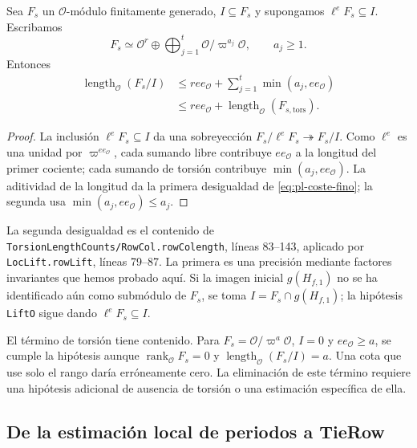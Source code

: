 \begin{proposicion}
\label{prop:pl-coste}
Sea $F_s$ un $\mathcal O$-módulo finitamente generado, $I\subseteq
F_s$ y supongamos $\ell^e F_s\subseteq I$. Escribamos
\[
 F_s\simeq\mathcal O^r\oplus
           \bigoplus_{j=1}^t\mathcal O/\varpi^{a_j}\mathcal O,
 \qquad a_j\geq1.
\]
Entonces
\begin{equation}
\begin{aligned}
 \operatorname{length}_{\mathcal O}(F_s/I)
 &\leq r e e_{\mathcal O}+\sum_{j=1}^t\min(a_j,e e_{\mathcal O})
 \\
 &\leq r e e_{\mathcal O}
      +\operatorname{length}_{\mathcal O}(F_{s,\mathrm{tors}}).
\end{aligned}
 \label{eq:pl-coste-fino}
\end{equation}
\end{proposicion}
\begin{proof}
La inclusión $\ell^eF_s\subseteq I$ da una sobreyección
$F_s/\ell^eF_s\twoheadrightarrow F_s/I$. Como
$\ell^e$ es una unidad por $\varpi^{e e_{\mathcal O}}$, cada
sumando libre contribuye $e e_{\mathcal O}$ a la longitud del
primer cociente; cada sumando de torsión contribuye
$\min(a_j,e e_{\mathcal O})$. La aditividad de la longitud da
la primera desigualdad de \eqref{eq:pl-coste-fino}; la segunda
usa $\min(a_j,e e_{\mathcal O})\le a_j$.
\end{proof}

La segunda desigualdad es el contenido de
\texttt{TorsionLengthCounts/RowCol.rowColength}, líneas 83--143,
aplicado por \texttt{LocLift.rowLift}, líneas 79--87. La primera
es una precisión mediante factores invariantes que hemos probado
aquí. Si la imagen inicial $g(H_{f,1})$ no se ha identificado aún
como submódulo de $F_s$, se toma
$I=F_s\cap g(H_{f,1})$; la hipótesis \texttt{LiftO} sigue dando
$\ell^eF_s\subseteq I$.

El término de torsión tiene contenido. Para
$F_s=\mathcal O/\varpi^a\mathcal O$, $I=0$ y
$e e_{\mathcal O}\geq a$, se cumple la hipótesis aunque
$\operatorname{rank}_{\mathcal O}F_s=0$ y
$\operatorname{length}_{\mathcal O}(F_s/I)=a$. Una cota que use
solo el rango daría erróneamente cero. La eliminación de este
término requiere una hipótesis adicional de ausencia de torsión
o una estimación específica de ella.

\subsection{De la estimación local de periodos a TieRow}
\label{subsec:pl-tie}

